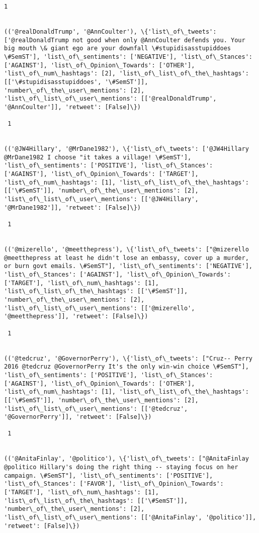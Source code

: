 \documentclass[11pt]{article}
\begin{document}
\begin{Verbatim}[commandchars=\\\{\}]
 1
 

(('@realDonaldTrump', '@AnnCoulter'), \{'list\_of\_tweets': ['@realDonaldTrump not good when only @AnnCoulter defends you. Your big mouth \& giant ego are your downfall \#stupidisasstupiddoes \#SemST'], 'list\_of\_sentiments': ['NEGATIVE'], 'list\_of\_Stances': ['AGAINST'], 'list\_of\_Opinion\_Towards': ['OTHER'], 'list\_of\_num\_hashtags': [2], 'list\_of\_list\_of\_the\_hashtags': [['\#stupidisasstupiddoes', '\#SemST']], 'number\_of\_the\_user\_mentions': [2], 'list\_of\_list\_of\_user\_mentions': [['@realDonaldTrump', '@AnnCoulter']], 'retweet': [False]\})

 1
 

(('@JW4Hillary', '@MrDane1982'), \{'list\_of\_tweets': ['@JW4Hillary @MrDane1982 I choose "it takes a village! \#SemST'], 'list\_of\_sentiments': ['POSITIVE'], 'list\_of\_Stances': ['AGAINST'], 'list\_of\_Opinion\_Towards': ['TARGET'], 'list\_of\_num\_hashtags': [1], 'list\_of\_list\_of\_the\_hashtags': [['\#SemST']], 'number\_of\_the\_user\_mentions': [2], 'list\_of\_list\_of\_user\_mentions': [['@JW4Hillary', '@MrDane1982']], 'retweet': [False]\})

 1
 

(('@mizerello', '@meetthepress'), \{'list\_of\_tweets': ["@mizerello @meetthepress at least he didn't lose an embassy, cover up a murder, or burn govt emails. \#SemST"], 'list\_of\_sentiments': ['NEGATIVE'], 'list\_of\_Stances': ['AGAINST'], 'list\_of\_Opinion\_Towards': ['TARGET'], 'list\_of\_num\_hashtags': [1], 'list\_of\_list\_of\_the\_hashtags': [['\#SemST']], 'number\_of\_the\_user\_mentions': [2], 'list\_of\_list\_of\_user\_mentions': [['@mizerello', '@meetthepress']], 'retweet': [False]\})

 1
 

(('@tedcruz', '@GovernorPerry'), \{'list\_of\_tweets': ["Cruz-- Perry 2016 @tedcruz @GovernorPerry It's the only win-win choice \#SemST"], 'list\_of\_sentiments': ['POSITIVE'], 'list\_of\_Stances': ['AGAINST'], 'list\_of\_Opinion\_Towards': ['OTHER'], 'list\_of\_num\_hashtags': [1], 'list\_of\_list\_of\_the\_hashtags': [['\#SemST']], 'number\_of\_the\_user\_mentions': [2], 'list\_of\_list\_of\_user\_mentions': [['@tedcruz', '@GovernorPerry']], 'retweet': [False]\})

 1
 

(('@AnitaFinlay', '@politico'), \{'list\_of\_tweets': ["@AnitaFinlay @politico Hillary's doing the right thing -- staying focus on her campaign. \#SemST"], 'list\_of\_sentiments': ['POSITIVE'], 'list\_of\_Stances': ['FAVOR'], 'list\_of\_Opinion\_Towards': ['TARGET'], 'list\_of\_num\_hashtags': [1], 'list\_of\_list\_of\_the\_hashtags': [['\#SemST']], 'number\_of\_the\_user\_mentions': [2], 'list\_of\_list\_of\_user\_mentions': [['@AnitaFinlay', '@politico']], 'retweet': [False]\})


\end{Verbatim}
\end{document}
